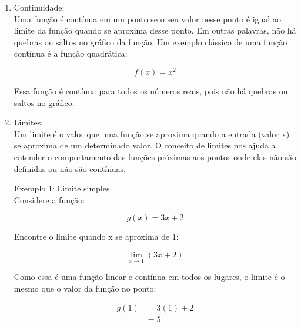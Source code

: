 \documentclass[analysis_notes.tex]{subfiles}
\begin{document}
\begin{enumerate}
	\item Continuidade: \\
	      Uma função é contínua em um ponto se o seu valor nesse ponto é igual ao limite da função quando se aproxima desse ponto. Em outras palavras, não há quebras ou saltos no gráfico da função. Um exemplo clássico de uma função contínua é a função quadrática:

	      \begin{equation*}
		      f(x) = x^2
	      \end{equation*}

	      Essa função é contínua para todos os números reais, pois não há quebras ou saltos no gráfico.

	      \begin{center}
	      \end{center}

	\item Limites: \\
	      Um limite é o valor que uma função se aproxima quando a entrada (valor x) se aproxima de um determinado valor. O conceito de limites nos ajuda a entender o comportamento das funções próximas aos pontos onde elas não são definidas ou não são contínuas.

	      Exemplo 1: Limite simples \\
	      Considere a função:

	      \begin{equation*}
		      g(x) = 3x + 2
	      \end{equation*}

	      Encontre o limite quando x se aproxima de 1:

	      \begin{equation*}
		      \lim_{x \to 1} (3x + 2)
	      \end{equation*}

	      Como essa é uma função linear e contínua em todos os lugares, o limite é o mesmo que o valor da função no ponto:

	      \begin{align*}
		      g(1) & = 3(1) + 2 \\
		           & = 5
	      \end{align*}


\end{enumerate}
\end{document}
